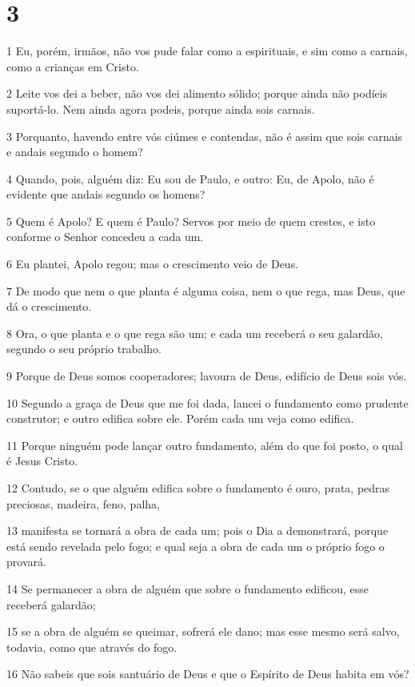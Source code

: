 \chapter{3}

\par 1 Eu, porém, irmãos, não vos pude falar como a espirituais, e sim como a carnais, como a crianças em Cristo.
\par 2 Leite vos dei a beber, não vos dei alimento sólido; porque ainda não podíeis suportá-lo. Nem ainda agora podeis, porque ainda sois carnais.
\par 3 Porquanto, havendo entre vós ciúmes e contendas, não é assim que sois carnais e andais segundo o homem?
\par 4 Quando, pois, alguém diz: Eu sou de Paulo, e outro: Eu, de Apolo, não é evidente que andais segundo os homens?
\par 5 Quem é Apolo? E quem é Paulo? Servos por meio de quem crestes, e isto conforme o Senhor concedeu a cada um.
\par 6 Eu plantei, Apolo regou; mas o crescimento veio de Deus.
\par 7 De modo que nem o que planta é alguma coisa, nem o que rega, mas Deus, que dá o crescimento.
\par 8 Ora, o que planta e o que rega são um; e cada um receberá o seu galardão, segundo o seu próprio trabalho.
\par 9 Porque de Deus somos cooperadores; lavoura de Deus, edifício de Deus sois vós.
\par 10 Segundo a graça de Deus que me foi dada, lancei o fundamento como prudente construtor; e outro edifica sobre ele. Porém cada um veja como edifica.
\par 11 Porque ninguém pode lançar outro fundamento, além do que foi posto, o qual é Jesus Cristo.
\par 12 Contudo, se o que alguém edifica sobre o fundamento é ouro, prata, pedras preciosas, madeira, feno, palha,
\par 13 manifesta se tornará a obra de cada um; pois o Dia a demonstrará, porque está sendo revelada pelo fogo; e qual seja a obra de cada um o próprio fogo o provará.
\par 14 Se permanecer a obra de alguém que sobre o fundamento edificou, esse receberá galardão;
\par 15 se a obra de alguém se queimar, sofrerá ele dano; mas esse mesmo será salvo, todavia, como que através do fogo.
\par 16 Não sabeis que sois santuário de Deus e que o Espírito de Deus habita em vós?
